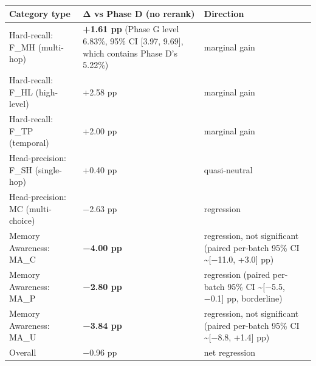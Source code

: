 \documentclass[
]{article}
\newcounter{none} %
\begin{document}
{\def\LTcaptype{none} %
\begin{longtable}[]{@{}
  >{\raggedright\arraybackslash}p{}
  >{\raggedleft\arraybackslash}p{}
  >{\raggedright\arraybackslash}p{}@{}}
\toprule\noalign{}
\begin{minipage}[b]{\linewidth}\raggedright
Category type
\end{minipage} & \begin{minipage}[b]{\linewidth}\raggedleft
Δ vs Phase D (no rerank)
\end{minipage} & \begin{minipage}[b]{\linewidth}\raggedright
Direction
\end{minipage} \\
\midrule\noalign{}
\endhead
\bottomrule\noalign{}
\endlastfoot
Hard-recall: F\_MH (multi-hop) & \textbf{+1.61 pp} (Phase G level
6.83\%, 95\% CI {[}3.97, 9.69{]}, which contains Phase D's 5.22\%) &
marginal gain \\
Hard-recall: F\_HL (high-level) & +2.58 pp & marginal gain \\
Hard-recall: F\_TP (temporal) & +2.00 pp & marginal gain \\
Head-precision: F\_SH (single-hop) & +0.40 pp & quasi-neutral \\
Head-precision: MC (multi-choice) & −2.63 pp & regression \\
Memory Awareness: MA\_C & \textbf{−4.00 pp} & regression, not
significant (paired per-batch 95\% CI \textasciitilde{[}−11.0, +3.0{]}
pp) \\
Memory Awareness: MA\_P & \textbf{−2.80 pp} & regression (paired
per-batch 95\% CI \textasciitilde{[}−5.5, −0.1{]} pp, borderline) \\
Memory Awareness: MA\_U & \textbf{−3.84 pp} & regression, not
significant (paired per-batch 95\% CI \textasciitilde{[}−8.8, +1.4{]}
pp) \\
Overall & −0.96 pp & net regression \\
\end{longtable}
}
\end{document}
